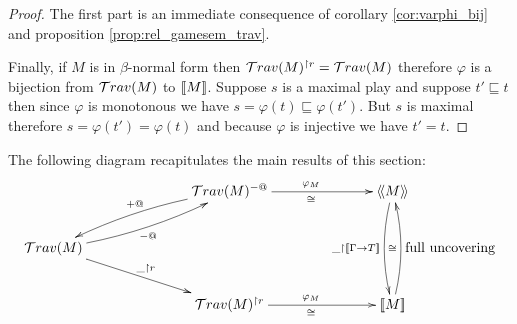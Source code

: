 \begin{proof}
The first part is an immediate consequence of corollary
\ref{cor:varphi_bij} and proposition
\ref{prop:rel_gamesem_trav}.

Finally, if $M$ is in $\beta$-normal form then
$\mathcal{T}rav(M)^{\upharpoonright r} = \mathcal{T}rav(M)$
therefore $\varphi$ is a bijection from $\mathcal{T}rav(M)$ to
${[\![ M ]\!]}$. Suppose $s$ is a maximal play and suppose $t' \sqsubseteq
t$ then since $\varphi$ is monotonous we have $s = \varphi(t) \sqsubseteq
\varphi(t')$. But $s$ is maximal therefore $s = \varphi(t') =
\varphi(t)$ and because $\varphi$ is injective we have $t'=t$.
\end{proof}

The following diagram recapitulates the main results of this section:
$$
\xymatrix @C=6pc{
                                           & \travset(M)^{-@} \ar@/_/[dl]_{+@}  \ar[r]^{\varphi_M}_\cong & \intersem{M} \ar@/_/[dd]_{\_ \upharpoonright \sem{\Gamma\rightarrow T}} \\
\travset(M) \ar@/_/[ur]_{-@}^{} \ar[dr]^{\_ \upharpoonright r}  \\
                                           & \travset(M)^{\upharpoonright r} \ar[r]^{\varphi_M}_\cong & \sem{M} \ar@/_/[uu]^{\cong}_{\mbox{full uncovering}}
}
$$

